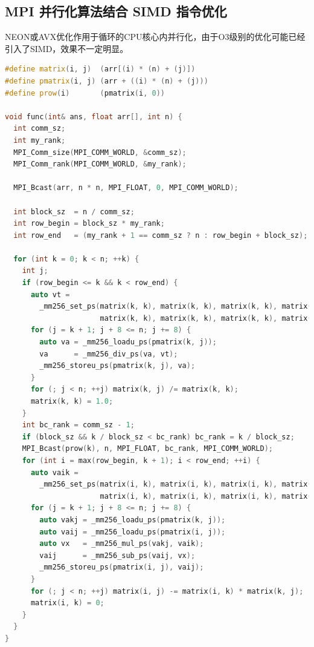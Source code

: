 \documentclass[a4paper]{article}
\begin{document}
\subsection{MPI 并行化算法结合 SIMD 指令优化}
NEON或AVX优化作用于循环的CPU核心内并行化，由于O3级别的优化可能已经引入了SIMD，效果不一定明显。
\begin{lstlisting}[title=AVX优化,frame=trbl,language={C++}]
#define matrix(i, j)  (arr[(i) * (n) + (j)])
#define pmatrix(i, j) (arr + ((i) * (n) + (j)))
#define prow(i)       (pmatrix(i, 0))

void func(int& ans, float arr[], int n) {
  int comm_sz;
  int my_rank;
  MPI_Comm_size(MPI_COMM_WORLD, &comm_sz);
  MPI_Comm_rank(MPI_COMM_WORLD, &my_rank);

  MPI_Bcast(arr, n * n, MPI_FLOAT, 0, MPI_COMM_WORLD);

  int block_sz  = n / comm_sz;
  int row_begin = block_sz * my_rank;
  int row_end   = (my_rank + 1 == comm_sz ? n : row_begin + block_sz);

  for (int k = 0; k < n; ++k) {
    int j;
    if (row_begin <= k && k < row_end) {
      auto vt =
        _mm256_set_ps(matrix(k, k), matrix(k, k), matrix(k, k), matrix(k, k),
                      matrix(k, k), matrix(k, k), matrix(k, k), matrix(k, k));
      for (j = k + 1; j + 8 <= n; j += 8) {
        auto va = _mm256_loadu_ps(pmatrix(k, j));
        va      = _mm256_div_ps(va, vt);
        _mm256_storeu_ps(pmatrix(k, j), va);
      }
      for (; j < n; ++j) matrix(k, j) /= matrix(k, k);
      matrix(k, k) = 1.0;
    }
    int bc_rank = comm_sz - 1;
    if (block_sz && k / block_sz < bc_rank) bc_rank = k / block_sz;
    MPI_Bcast(prow(k), n, MPI_FLOAT, bc_rank, MPI_COMM_WORLD);
    for (int i = max(row_begin, k + 1); i < row_end; ++i) {
      auto vaik =
        _mm256_set_ps(matrix(i, k), matrix(i, k), matrix(i, k), matrix(i, k),
                      matrix(i, k), matrix(i, k), matrix(i, k), matrix(i, k));
      for (j = k + 1; j + 8 <= n; j += 8) {
        auto vakj = _mm256_loadu_ps(pmatrix(k, j));
        auto vaij = _mm256_loadu_ps(pmatrix(i, j));
        auto vx   = _mm256_mul_ps(vakj, vaik);
        vaij      = _mm256_sub_ps(vaij, vx);
        _mm256_storeu_ps(pmatrix(i, j), vaij);
      }
      for (; j < n; ++j) matrix(i, j) -= matrix(i, k) * matrix(k, j);
      matrix(i, k) = 0;
    }
  }
}
\end{lstlisting}
\end{document}
